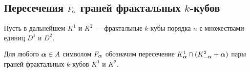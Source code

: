 \subsection{Пересечения $F_\alpha$ граней фрактальных $k$-кубов}

Пусть в дальнейшем $K^1$ и $K^2$ --- фрактальные $k$-кубы порядка $n$ с множествами единиц $D^1$ и $D^2$.

\begin{definition}\label{def:F_alpha}
Для любого ${\bm{\alpha}}\in A$ символом $F_{\bm{\alpha}}$ обозначим пересечение $K^1_{\bm{\alpha}}\cap(K^2_{-{\bm{\alpha}}}+{\bm{\alpha}})$ пары граней фрактальных $k$-кубов $K^1$ и $K^2$.
\end{definition}

%
%
%
%

